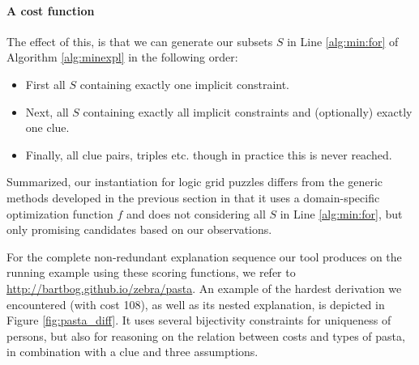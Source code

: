 \paragraph{A cost function}
The effect of this, is that we can generate our subsets $S$ in Line \ref{alg:min:for}
 of Algorithm \ref{alg:minexpl} in the following order:
\begin{itemize}
 \item First all $S$ containing exactly one implicit constraint.
 \item Next, all $S$ containing exactly all implicit constraints and (optionally) exactly one clue.
 \item Finally, all clue pairs, triples etc. though in practice this is never reached.
\end{itemize}
Summarized, our instantiation for logic grid puzzles differs from the generic methods developed in the previous section in that it uses a domain-specific optimization function $f$ and does not considering all $S$ in Line \ref{alg:min:for}, but only promising candidates based on our observations.

For the complete non-redundant explanation sequence our tool produces on the running example using these scoring functions, we refer to \url{http://bartbog.github.io/zebra/pasta}. An example of the hardest derivation we encountered (with cost 108), as well as its nested explanation, is depicted in Figure \ref{fig:pasta_diff}. It uses several bijectivity constraints for uniqueness of persons, but also for reasoning on the relation between costs and types of pasta, in combination with a clue and three assumptions.



